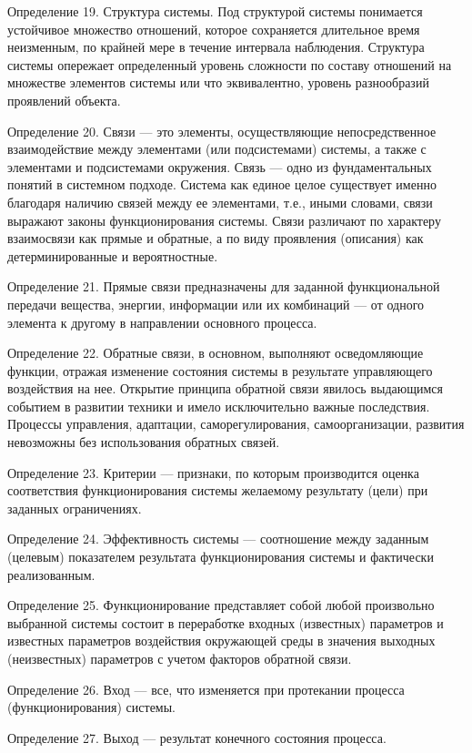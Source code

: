 Определение 19. Структура системы. Под структурой системы понимается устойчивое множество отношений, которое сохраняется длительное время неизменным, по крайней мере в течение интервала наблюдения. Структура системы опережает определенный уровень сложности по составу отношений на множестве элементов системы или что эквивалентно, уровень разнообразий проявлений объекта.


Определение 20. Связи — это элементы, осуществляющие непосредственное взаимодействие между элементами (или подсистемами) системы, а также с элементами и подсистемами окружения. Связь — одно из фундаментальных понятий в системном подходе. Система как единое целое существует именно благодаря наличию связей между ее элементами, т.е., иными словами, связи выражают законы функционирования системы. Связи различают по характеру взаимосвязи как прямые и обратные, а по виду проявления (описания) как детерминированные и вероятностные.

Определение 21. Прямые  связи  предназначены  для  заданной  функциональной передачи вещества, энергии, информации или их комбинаций — от одного элемента к другому в направлении основного процесса.

Определение 22. Обратные связи, в основном, выполняют осведомляющие функции, отражая изменение состояния системы в результате управляющего воздействия на нее. Открытие принципа обратной связи явилось выдающимся событием в развитии техники и имело исключительно важные последствия. Процессы управления, адаптации, саморегулирования, самоорганизации, развития невозможны без использования обратных связей.

Определение 23. Критерии — признаки, по которым производится оценка соответствия функционирования системы желаемому результату (цели) при заданных ограничениях.

Определение 24. Эффективность системы — соотношение между заданным (целевым) показателем результата функционирования системы и фактически реализованным.

Определение 25. Функционирование представляет собой  любой произвольно выбранной системы состоит в переработке входных (известных) параметров и известных параметров воздействия окружающей среды в значения выходных (неизвестных) параметров с учетом факторов обратной связи.

Определение 26. Вход — все, что изменяется при протекании процесса (функционирования) системы.

Определение 27. Выход — результат конечного состояния процесса.

